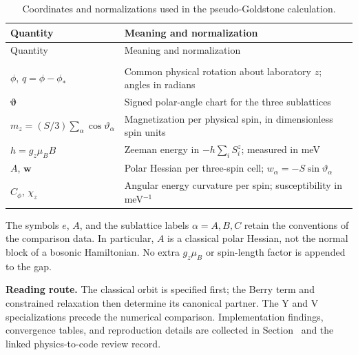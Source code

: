 \begin{longtable}[]{@{}
  >{\raggedright\arraybackslash}p{}
  >{\raggedright\arraybackslash}p{}@{}}
\toprule\noalign{}
\begin{minipage}[b]{\linewidth}\raggedright
Quantity
\end{minipage} & \begin{minipage}[b]{\linewidth}\raggedright
Meaning and normalization
\end{minipage} \\
\midrule\noalign{}
\endfirsthead
\toprule\noalign{}
\begin{minipage}[b]{\linewidth}\raggedright
Quantity
\end{minipage} & \begin{minipage}[b]{\linewidth}\raggedright
Meaning and normalization
\end{minipage} \\
\midrule\noalign{}
\endhead
\bottomrule\noalign{}
\caption{Coordinates and normalizations used in the pseudo-Goldstone calculation.}\label{tab-nbcp-a-pseudo-goldstone-gap-1}\\
\endlastfoot
\(\phi\), \(q=\phi-\phi_*\) & Common physical rotation about laboratory
\(z\); angles in radians \\
\(\boldsymbol\vartheta\) & Signed polar-angle chart for the three
sublattices \\
\(m_z=(S/3)\sum_\alpha\cos\vartheta_\alpha\) & Magnetization per
physical spin, in dimensionless spin units \\
\(h=g_z\mu_B B\) & Zeeman energy in \(-h\sum_i S_i^z\); measured in
meV \\
\(A\), \(\mathbf w\) & Polar Hessian per three-spin cell;
\(w_\alpha=-S\sin\vartheta_\alpha\) \\
\(C_\phi\), \(\chi_z\) & Angular energy curvature per spin;
susceptibility in meV\(^{-1}\) \\
\end{longtable}

The symbols \(e\), \(A\), and the sublattice labels \(\alpha=A,B,C\)
retain the conventions of the comparison data. In particular, \(A\) is a
classical polar Hessian, not the normal block of a bosonic Hamiltonian.
No extra \(g_z\mu_B\) or spin-length factor is appended to the gap.

\textbf{Reading route.} The classical orbit is specified first; the
Berry term and constrained relaxation then determine its canonical
partner. The Y and V specializations precede the numerical comparison.
Implementation findings, convergence tables, and reproduction details
are collected in Section~ and the
linked physics-to-code review record.

